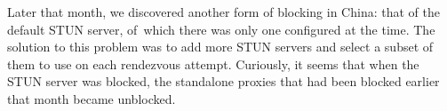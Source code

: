 \documentclass[letterpaper,twocolumn]{article}
\begin{document}
Later that month, we discovered another form of blocking in China:
that of the default STUN server,
of~which there was only one configured at the time.
The solution to this problem was to add more STUN servers
and select a subset of them to use on each rendezvous attempt.
Curiously, it seems that when the STUN server was blocked,
the standalone proxies that had been blocked earlier that month became unblocked.
\end{document}
